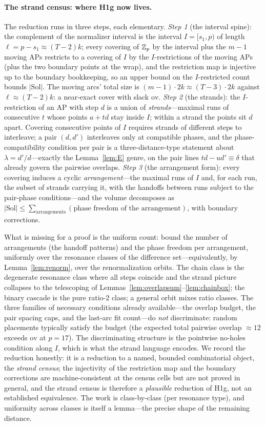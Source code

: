 \paragraph{The strand census: where H1g now lives.}
The reduction runs in three steps, each elementary. \emph{Step 1}
(the interval spine): the complement of the normalizer interval is the
interval $I=[s_1,p)$ of length $\ell=p-s_1\approx(T-2)k$; every
covering of $\mathbb{Z}_p$ by the interval plus the $m-1$ moving APs restricts
to a covering of $I$ by the $I$-restrictions of the moving APs (plus
the two boundary points at the wrap), and the restriction map is
injective up to the boundary bookkeeping, so an upper bound on the
$I$-restricted count bounds $|\mathrm{Sol}|$. The moving arcs' total
size is $(m-1)\cdot2k\approx(T-3)\cdot2k$ against
$\ell\approx(T-2)k$: a near-exact cover with slack $\mathrm{ov}$.
\emph{Step 2} (the strands): the $I$-restriction of an AP with step
$d$ is a union of \emph{strands}---maximal runs of consecutive $t$
whose points $a+td$ stay inside $I$; within a strand the points sit $d$
apart. Covering consecutive points of $I$ requires strands of
different steps to interleave; a pair $(d,d')$ interleaves only at
compatible phases, and the phase-compatibility condition per pair is
a three-distance-type statement about $\lambda=d'/d$---exactly the
Lemma~\ref{lem:E} genre, on the pair lines $td-ud'\equiv\delta$ that
already govern the pairwise overlaps. \emph{Step 3} (the arrangement
form): every covering induces a cyclic \emph{arrangement}---the
maximal runs of $I$ and, for each run, the subset of strands carrying
it, with the handoffs between runs subject to the pair-phase
conditions---and the volume decomposes as
$|\mathrm{Sol}|\le\sum_{\text{arrangements}}(\text{phase freedom of
the arrangement})$, with boundary corrections.

What is missing for a proof is the uniform count: bound the number of
arrangements (the handoff patterns) and the phase freedom per
arrangement, uniformly over the resonance classes of the difference
set---equivalently, by Lemma~\ref{lem:renorm}, over the
renormalization orbits. The chain class is the degenerate resonance
class where all steps coincide and the strand picture collapses to the
telescoping of Lemmas~\ref{lem:overlapsum}--\ref{lem:chainbox}; the
binary cascade is the pure ratio-$2$ class; a general orbit mixes
ratio classes. The three families of necessary conditions already
available---the overlap budget, the pair spacing caps, and the
last-arc fit count---do \emph{not} discriminate: random placements
typically satisfy the budget (the expected total pairwise overlap
$\approx12$ exceeds $\mathrm{ov}$ at $p=17$). The discriminating
structure is the pointwise no-holes condition along $I$, which is what
the strand language encodes. We record the reduction honestly: it is a
reduction to a named, bounded combinatorial object, the \emph{strand
census}; the injectivity of the restriction map and the boundary
corrections are machine-consistent at the census cells but are not
proved in general, and the strand census is therefore a
\emph{plausible} reduction of H1g, not an established equivalence. The
work is class-by-class (per resonance type), and uniformity across
classes is itself a lemma---the precise shape of the remaining distance.

